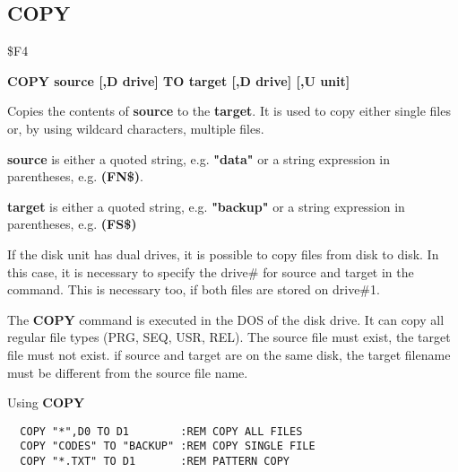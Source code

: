 \subsection{COPY}
\begin{description}[leftmargin=2cm,style=nextline]
\item [Token:] \$F4
\item [Format:] {\bf COPY source [,D drive] TO
                target [,D drive] [,U unit] }
\item [Usage:]
   Copies the contents of
   {\bf source} to the {\bf target}.
   It is used to copy either single files or, by using
   wildcard characters, multiple files.

   {\bf source} is either a quoted string, e.g. {\bf "data"} or
   a string expression in parentheses, e.g. {\bf (FN\$)}.

   {\bf target} is either a quoted string, e.g. {\bf "backup"} or
   a string expression in parentheses, e.g. {\bf (FS\$)}

   If the disk unit has dual drives, it is possible to copy
   files from disk to disk.
   In this case, it is necessary to specify the drive\#
   for source and target in the command. This is necessary too, if both
   files are stored on drive\#1.

   \drivedefinition

   \unitdefinition

\item [Remarks:]
   The {\bf COPY} command is executed in the DOS of the disk drive.
   It can copy all regular file types (PRG, SEQ, USR, REL).
   The source file must exist, the target file must not exist.
   if source and target are on the same disk, the target filename
   must be different from the source file name.

\item [Example:] Using {\bf COPY}
\begin{tcolorbox}[colback=black,coltext=white]
\verbatimfont{\codefont}
\begin{verbatim}
  COPY "*",D0 TO D1        :REM COPY ALL FILES
  COPY "CODES" TO "BACKUP" :REM COPY SINGLE FILE
  COPY "*.TXT" TO D1       :REM PATTERN COPY
\end{verbatim}
\end{tcolorbox}
\end{description}


\newpage
